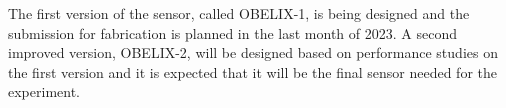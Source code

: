 The first version of the sensor, called OBELIX-1, is being designed and the submission for fabrication is planned in the last month of 2023. A second improved version, OBELIX-2, will be designed based on performance studies on the first version and it is expected that it will be the final sensor needed for the experiment.\\


\begin{comment}
\bigskip

In this chapter we have introduced some of the fundamental aspects of the proposed VTX upgrade, suppported by continuous studies and simulations. In the following we will see in more details the technology on which the whole proposal is based: the CMOS Monolithic Active Pixel Sensor.

\end{comment}


